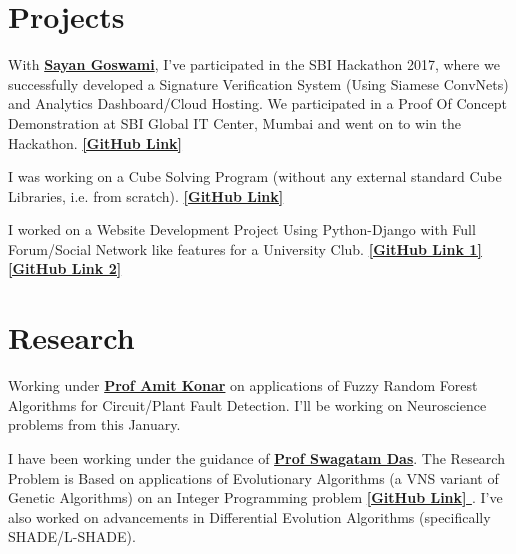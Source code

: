 \documentclass[]{deedy-resume-openfont}
\begin{document}
\hfill
\begin{minipage}[t]{0.66\textwidth} 


\section{Projects}
With \textbf{\href{https://github.com/Sayan98}{Sayan Goswami}}, I've participated in the SBI Hackathon 2017, where we successfully developed a Signature Verification System (Using Siamese ConvNets) and Analytics Dashboard/Cloud Hosting. We participated in a Proof Of Concept Demonstration at SBI Global IT Center, Mumbai and went on to win the Hackathon. \textbf{\href{https://github.com/AyanSinhaMahapatra/AutoSIGN}{ [GitHub Link] }}
\sectionsep

I was working on a Cube Solving Program (without any external standard Cube Libraries, i.e. from scratch). \textbf{\href{https://github.com/AyanSinhaMahapatra/CubeSolving}{ [GitHub Link] }}
\sectionsep

I worked on a Website Development Project Using Python-Django with Full Forum/Social Network like features for a University Club. 
\textbf{\href{https://github.com/AyanSinhaMahapatra/Univnet_Beta}{ [GitHub Link 1] }} \textbf{\href{https://github.com/AyanSinhaMahapatra/AnswerIt}{ [GitHub Link 2] }}
\sectionsep


\section{Research}
Working under \textbf{\href{https://www.amitkonar.com/}{Prof Amit Konar}} on applications of Fuzzy Random Forest Algorithms for Circuit/Plant Fault Detection. I'll be working on Neuroscience problems from this January. 
\sectionsep

I have been working under the guidance of \textbf{\href{https://www.isical.ac.in/~swagatam.das/}{Prof Swagatam Das}}. The Research Problem is Based on applications of Evolutionary Algorithms (a VNS variant of Genetic Algorithms) on an Integer Programming problem \textbf{\href{https://github.com/AyanSinhaMahapatra/Gene_Algos}{ [GitHub Link] }}. I've also worked on advancements in Differential Evolution Algorithms (specifically SHADE/L-SHADE).


\end{minipage}
\end{document}
